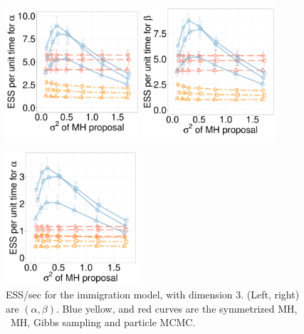   \begin{figure}[H]
  
  \begin{minipage}[hp]{0.65\linewidth}
  \centering
    \includegraphics [width=0.44\textwidth, angle=0]{figs/new_whole_exp_figs/q_alpha_dim3.pdf}
    \includegraphics [width=0.44\textwidth, angle=0]{figs/new_whole_exp_figs/q_beta_dim3.pdf}
  \end{minipage}
  \begin{minipage}[!hp]{0.33\linewidth}
    \caption{ESS/sec for the immigration model, with dimension 3. (Left, 
      right) are $(\alpha, \beta)$. Blue yellow, and red curves are the symmetrized MH,
  \naive\ MH, Gibbs sampling and particle MCMC.}
     \label{fig:ESS_Q_D33}
  \end{minipage}
  \centering
  \begin{minipage}[!hp]{0.65\linewidth}
  \centering
    \includegraphics [width=0.44\textwidth, angle=0]{figs/new_whole_exp_figs/cq_alpha_dim3.pdf}

\end{minipage}
\end{figure}
